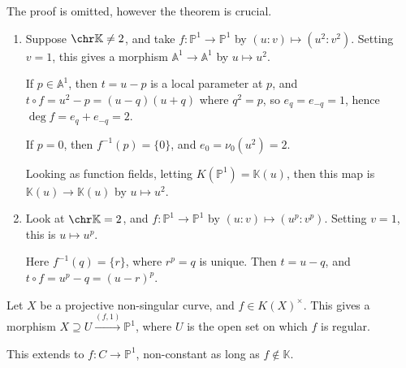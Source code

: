 \documentclass[12pt]{article}
\begin{document}
The proof is omitted, however the theorem is crucial.

\begin{exbox}
	\begin{enumerate}[1.]
		\item Suppose $\chr \mathbb{K} \neq 2$, and take $f : \mathbb{P}^1 \to \mathbb{P}^1$ by $(u : v) \mapsto (u^2 : v^2)$. Setting $v = 1$, this gives a morphism $\mathbb{A}^1 \to \mathbb{A}^1$ by $u \mapsto u^2$.

			If $p \in \mathbb{A}^1$, then $t = u - p$ is a local parameter at $p$, and $t \circ f = u^2 - p = (u - q)(u + q)$ where $q^2 = p$, so $e_q = e_{-q} = 1$, hence $\deg f = e_q + e_{-q} = 2$.

			If $p = 0$, then $f^{-1}(p) = \{0\}$, and $e_0 = \nu_0(u^2) = 2$.

			Looking as function fields, letting $K(\mathbb{P}^1) = \mathbb{K}(u)$, then this map is $\mathbb{K}(u) \to \mathbb{K}(u)$ by $u \mapsto u^2$.
		\item Look at $\chr \mathbb{K} = 2$, and $f : \mathbb{P}^1 \to \mathbb{P}^1$ by $(u : v) \mapsto (u^p : v^p)$. Setting $v = 1$, this is $u \mapsto u^p$.

			Here $f^{-1}(q) = \{r\}$, where $r^p = q$ is unique. Then $t = u - q$, and $t \circ f= u^p - q = (u - r)^p$.
	\end{enumerate}
\end{exbox}

Let $X$ be a projective non-singular curve, and $f \in K(X)^\times$. This gives a morphism $X \supseteq U \overset{(f, 1)} \to \mathbb{P}^1$, where $U$ is the open set on which $f$ is regular.

This extends to $f : C \to \mathbb{P}^1$, non-constant as long as $f \not \in \mathbb{K}$.

\newpage

\printindex
\end{document}
